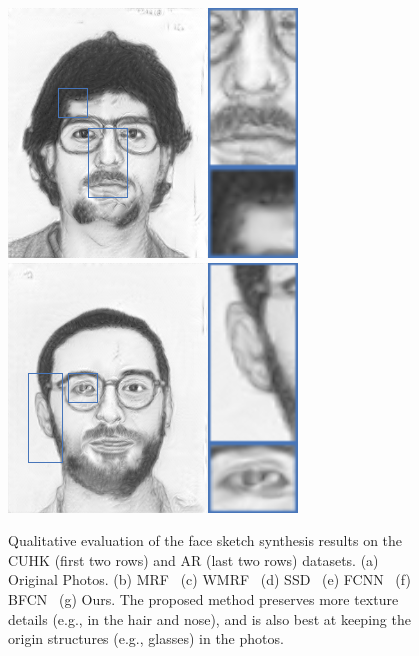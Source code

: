 \documentclass[10pt,twocolumn,letterpaper]{article}
\def\blue[#1]{{#1}}
\begin{document}
\begin{figure}[htbp]
{\begin{minipage}[b]{0.13\linewidth}
\includegraphics[width=0.99\linewidth]{img/sketch_result/ours_s3.png}
\includegraphics[width=0.99\linewidth]{img/sketch_result/ours_s4.png}
\end{minipage}
}
\caption{Qualitative evaluation of the face sketch synthesis results on the CUHK (first two rows) and AR (last two rows) datasets. (a) \blue[Original Photos]. (b) MRF~\cite{wang2009face} (c) WMRF~\cite{zhou2012markov} (d) SSD~\cite{song2014real} (e) FCNN~\cite{zhang2015end} (f) BFCN~\cite{zhang2017content} (g) Ours. The proposed method preserves more texture details (e.g., in the hair and nose), and is also best at keeping the origin structures (e.g., glasses) in the photos.}
\label{fig:qua_eval}
\end{figure}
\end{document}

